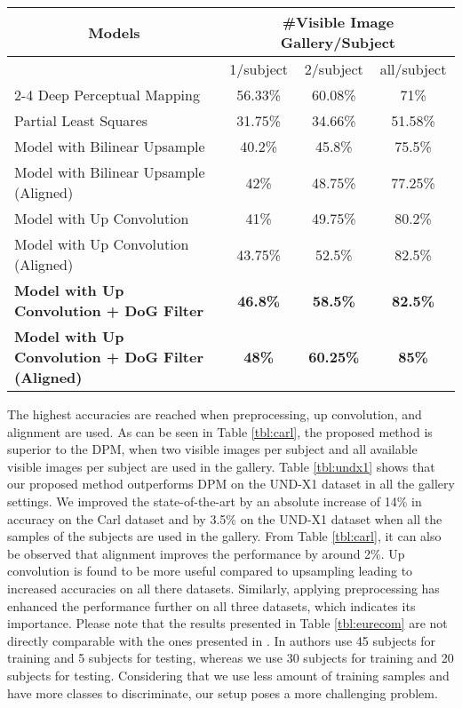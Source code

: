 \documentclass[conference]{IEEEtran}
\begin{document}
\begin{table*}[tb]
\caption{\label{tbl:carl}Rank-1 recognition accuracies on the Carl dataset}
\centering
\begin{tabular}{lccc}
\multicolumn{1}{c}{Models} & \multicolumn{3}{c}{\#Visible Image Gallery/Subject} \\ \hline
 & 1/subject & 2/subject & all/subject \\ \cline{2-4} 
Deep Perceptual Mapping \cite{deepperceptual} & 56.33\% & 60.08\% & 71\% \\
Partial Least Squares \cite{partialleastsquares} & 31.75\% & 34.66\% & 51.58\% \\
Model with Bilinear Upsample  & 40.2\% & 45.8\% & 75.5\% \\
Model with Bilinear Upsample (Aligned) & 42\% & 48.75\% & 77.25\% \\
Model with Up Convolution  & 41\% & 49.75\% & 80.2\% \\
Model with Up Convolution (Aligned) & 43.75\% & 52.5\% & 82.5\% \\
\textbf{Model with Up Convolution + DoG Filter } & \textbf{46.8\%} & \textbf{58.5\%} & \textbf{82.5\%}\\
\textbf{Model with Up Convolution + DoG Filter (Aligned)} & \textbf{48\%} & \textbf{60.25\%} & \textbf{85\%}
\end{tabular}
\end{table*}

The highest accuracies are reached when preprocessing, up convolution, and alignment are used. As can be seen in Table \ref{tbl:carl}, the proposed method is superior to the DPM, when two visible images per subject and all available visible images per subject are used in the gallery. Table \ref{tbl:undx1} shows that our proposed method outperforms DPM on the UND-X1 dataset in all the gallery settings. We improved the state-of-the-art by an absolute increase of 14\% in accuracy on the Carl dataset and by 3.5\% on the UND-X1 dataset when all the samples of the subjects are used in the gallery. From Table \ref{tbl:carl}, it can also be observed that alignment improves the performance by around 2\%. Up convolution is found to be more useful compared to upsampling leading to increased accuracies on all there datasets. Similarly, applying preprocessing has enhanced the performance further on all three datasets, which indicates its importance. Please note that the results presented in Table \ref{tbl:eurecom} are not directly comparable with the ones presented in \cite{crossspectrumeurecom}. In \cite{crossspectrumeurecom} authors use 45 subjects for training and 5 subjects for testing, whereas we use 30 subjects for training and 20 subjects for testing. Considering that we use less amount of training samples and have more classes to discriminate, our setup poses a more challenging problem.   
\end{document}

